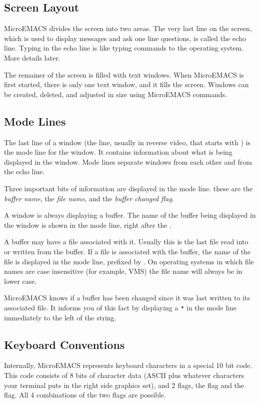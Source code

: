 \subsection{Screen Layout}
MicroEMACS divides the screen into two areas. The very last
line on the screen, which is used to display messages and
ask one line questions, is called the echo line. Typing in the echo line
is like typing commands to the operating system. More details later.

The remainer of the screen is filled with text windows.
When MicroEMACS is first started, there is only one text window, and it
fills the screen. Windows can be created, deleted, and adjusted in
size using MicroEMACS commands.
\subsection{Mode Lines}
The last line of a window (the line, usually in reverse video,
that starts with ) is
the mode line for the window.
It contains information about what is being displayed in the
window. Mode lines separate windows from each other and from the
echo line.

Three important bits of information are displayed in the mode line.
these are the {\em buffer name\/}, the {\em file name\/},
and the {\em buffer changed flag\/}.

A window is always displaying a buffer. The name of the buffer being
displayed in the window is shown in the mode line, right after the
.

A buffer may have a file associated with it.
Usually this is the last file read into or written from the
buffer. If a file is associated with the buffer, the name of the
file is displayed in the mode line, prefixed by .
On operating systems in which file names are case insensitive
(for example, VMS) the file name will always be in lower case.

MicroEMACS knows if a buffer has been changed since it was last
written to its associated file. It informs you of this fact by displaying
a \verb+*+ in the mode line immediately to the left of the 
string.
\subsection{Keyboard Conventions}
Internally, MicroEMACS represents keyboard characters in a special
10 bit code. This code consists of 8 bits of character data (ASCII plus
whatever characters your terminal puts in the right side graphics set), and
2 flags, the \CONTROL{} flag and the \META{} flag.
All 4 combinations of the two flags are possible.


